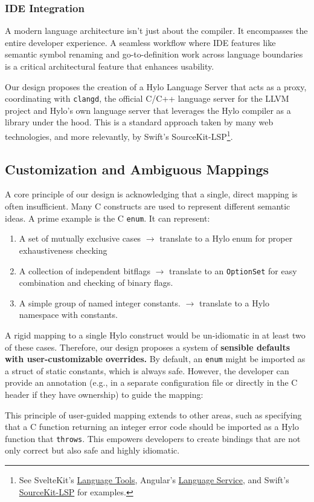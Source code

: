 \subsubsection{IDE Integration}

A modern language architecture isn't just about the compiler. It encompasses the entire developer experience. A seamless workflow where IDE features like semantic symbol renaming and go-to-definition work across language boundaries is a critical architectural feature that enhances usability.

Our design proposes the creation of a Hylo Language Server that acts as a proxy, coordinating with \texttt{clangd}, the official C/C++ language server for the LLVM project and Hylo's own language server that leverages the Hylo compiler as a library under the hood. This is a standard approach taken by many web technologies, and more relevantly, by Swift's SourceKit-LSP\footnote{See SvelteKit's \href{https://github.com/sveltejs/language-tools/}{Language Tools}, Angular's \href{https://github.com/angular/angular/tree/main/packages/language-service}{Language Service}, and Swift's \href{https://github.com/swiftlang/sourcekit-lsp}{SourceKit-LSP} for examples.}.

\subsection{Customization and Ambiguous Mappings}

A core principle of our design is acknowledging that a single, direct mapping is often insufficient. Many C constructs are used to represent different semantic ideas. A prime example is the C \texttt{enum}. It can represent:
\begin{enumerate}
    \item A set of mutually exclusive cases \(\rightarrow\) translate to a Hylo enum for proper exhaustiveness checking
    \item A collection of independent bitflags \(\rightarrow\) translate to an \texttt{OptionSet} \cite{OptionSet} for easy combination and checking of binary flags.
    \item A simple group of named integer constants. \(\rightarrow\) translate to a Hylo namespace with constants.
\end{enumerate}
A rigid mapping to a single Hylo construct would be un-idiomatic in at least two of these cases. Therefore, our design proposes a system of \textbf{sensible defaults with user-customizable overrides.} By default, an \texttt{enum} might be imported as a struct of static constants, which is always safe. However, the developer can provide an annotation (e.g., in a separate configuration file or directly in the C header if they have ownership) to guide the mapping:

This principle of user-guided mapping extends to other areas, such as specifying that a C function returning an integer error code should be imported as a Hylo function that \texttt{throws}. This empowers developers to create bindings that are not only correct but also safe and highly idiomatic.

